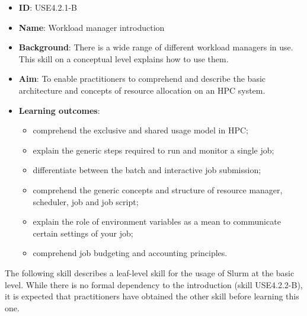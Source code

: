 \documentclass[jocse]{jocseart}
\begin{document}
\begin{itemize}
  \item \textbf{ID}: USE4.2.1-B
  \item \textbf{Name}: Workload manager introduction
  \item \textbf{Background}: There is a wide range of different workload managers in use. This skill on a conceptual level explains how to use them.
  \item \textbf{Aim}: To enable practitioners to comprehend and describe the basic architecture and concepts of resource allocation on an HPC system.
  \item \textbf{Learning outcomes}:

  \begin{itemize}
  \item comprehend the exclusive and shared usage model in HPC;
  \item explain the generic steps required to run and monitor a single job;
  \item differentiate between the batch and interactive job submission;
  \item comprehend the generic concepts and structure of resource manager, scheduler, job and job script;
  \item explain the role of environment variables as a mean to communicate certain settings of your job;
  \item comprehend job budgeting and accounting principles.
  \end{itemize}
\end{itemize}


The following skill describes a leaf-level skill for the usage of Slurm at the basic level.
While there is no formal dependency to the introduction (skill USE4.2.2-B), it is expected that practitioners have obtained the other skill before learning this one.
\end{document}
